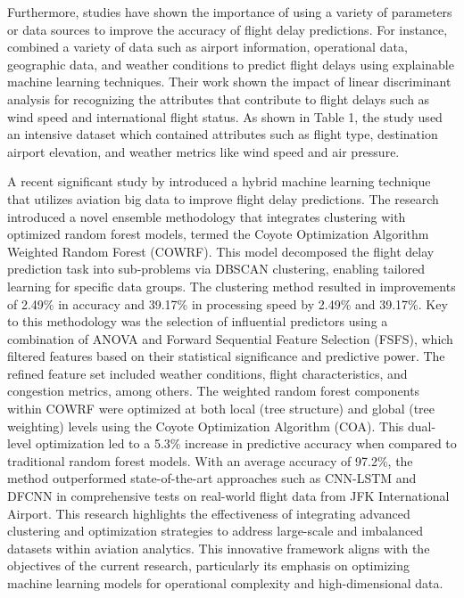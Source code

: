 \documentclass[twoside,11pt]{article}
\begin{document}
Furthermore, studies have shown the importance of using a variety of parameters or data sources to improve the accuracy of flight delay predictions. For instance, \cite{integratingMultipleData} combined a variety of data such as airport information, operational data, geographic data, and weather conditions to predict flight delays using explainable machine learning techniques. Their work shown the impact of linear discriminant analysis for recognizing the attributes that contribute to flight delays such as wind speed and international flight status. As shown in Table 1, the study used an intensive dataset which contained attributes such as flight type, destination airport elevation, and weather metrics like wind speed and air pressure.  

A recent significant study by \cite{Dai2024} introduced a hybrid machine learning technique that utilizes aviation big data to improve flight delay predictions. The research introduced a novel ensemble methodology that integrates clustering with optimized random forest models, termed the Coyote Optimization Algorithm Weighted Random Forest (COWRF). This model decomposed the flight delay prediction task into sub-problems via DBSCAN clustering, enabling tailored learning for specific data groups. The clustering method resulted in improvements of 2.49\% in accuracy and 39.17\% in processing speed by 2.49\% and 39.17\%. Key to  this methodology was the selection of influential predictors using a combination of ANOVA and Forward Sequential Feature Selection (FSFS), which filtered features based on their statistical significance and predictive power. The refined feature set included weather conditions, flight characteristics, and congestion metrics, among others. The weighted random forest components within COWRF were optimized at both local (tree structure) and global (tree weighting) levels using the Coyote Optimization Algorithm (COA). This dual-level optimization led to a 5.3\% increase in predictive accuracy when compared to traditional random forest models. With an average accuracy of 97.2\%, the method outperformed state-of-the-art approaches such as CNN-LSTM and DFCNN in comprehensive tests on real-world flight data from JFK International Airport. This research highlights the effectiveness of integrating advanced clustering and optimization strategies to address large-scale and imbalanced datasets within aviation analytics. This innovative framework aligns with the objectives of the current research, particularly its emphasis on optimizing machine learning models for operational complexity and high-dimensional data.
\end{document}

